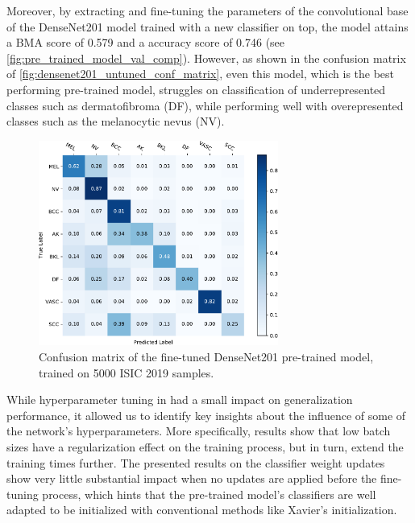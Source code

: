     Moreover, by extracting and fine-tuning the parameters of the convolutional base of the DenseNet201 model trained with a new classifier on top, the model attains a \ac{BMA} score of 0.579 and a accuracy score of 0.746 (see \autoref{fig:pre_trained_model_val_comp}). However, as shown in the confusion matrix of \autoref{fig:densenet201_untuned_conf_matrix}, even this model, which is the best performing pre-trained model, struggles on classification of underrepresented classes such as dermatofibroma (DF), while performing well with overepresented classes such as the melanocytic nevus (NV). \par
    \begin{figure}[ht]
        \centering
        \includegraphics[width=0.7\textwidth]{figs/densenet201_untuned_conf_matrix.pdf}
        \caption{Confusion matrix of the fine-tuned DenseNet201 pre-trained model, trained on 5000 \ac{ISIC} 2019 samples.}
        \label{fig:densenet201_untuned_conf_matrix}
    \end{figure}
    
    While hyperparameter tuning in  had a small impact on generalization performance, it allowed us to identify key insights about the influence of some of the network's hyperparameters. More specifically, results show that low batch sizes have a regularization effect on the training process, but in turn, extend the training times further. The presented results on the classifier weight updates show very little substantial impact when no updates are applied before the fine-tuning process, which hints that the pre-trained model's classifiers are well adapted to be initialized with conventional methods like Xavier's initialization. \par
    
